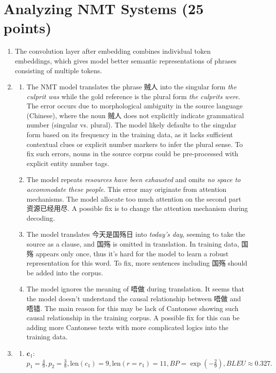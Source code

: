 \documentclass[11pt, a4paper, oneside]{article}
\begin{document}
\section{Analyzing NMT Systems (25 points)}
\begin{enumerate}[label=(\alph*), left=0pt, labelsep=1em, itemsep=1em]
    \item The convolution layer after embedding combines individual token embeddings, 
    which gives model better semantic representations of phrases consisting of multiple tokens.
    \item \begin{enumerate}[label=\roman*., left=0pt, labelsep=1em, itemsep=1em]
    \item The NMT model translates the phrase 贼人 into the singular form \textit{the 
    culprit was} while the gold reference is the plural form \textit{the culprits were}. 
    The error occurs due to morphological ambiguity in the source language (Chinese), 
    where the noun 贼人 does not explicitly indicate grammatical number (singular vs. plural). 
    The model likely defaults to the singular form based on its frequency in the training data, 
    as it lacks sufficient contextual clues or explicit number markers to infer the plural sense.
    To fix such errors, nouns in the source corpus could be pre-processed with explicit entity 
    number tags.
    \item The model repeats \textit{resources have been exhausted} and omits 
    \textit{no space to accommodate these people}. This error may originate from 
    attention mechanisms. The model allocate too much attention on the second part
    资源已经用尽. A possible fix is to change the attention mechanism during decoding.
    \item The model translates 今天是国殇日 into \textit{today's day}, seeming to take
    the source as a clause, and 国殇 is omitted in translation. In training data, 国殇
    appears only once, thus it's hard for the model to learn a robust representation for
    this word. To fix, more sentences including 国殇 should be added into the corpus.
    \item The model ignores the meaning of 唔做 during translation. It seems that the
    model doesn't understand the causal relationship between 唔做 and 唔错. The main reason for
    this may be lack of Cantonese showing such causal relationship in the training corpus. A 
    possible fix for this can be adding more Cantonese texts with more complicated logics into
    the training data.
    \end{enumerate}
    \item 
    \begin{enumerate}[label=\roman*., left=0pt, labelsep=1em, itemsep=1em]
    \item $\mathbf c_1$: $p_1 = \frac{4}{9}, p_2 = \frac{3}{8}, \mathrm{len}(c_1)=9, \mathrm{len}(r = r_1)=11, BP=\exp\left(-\frac{2}{9}\right), BLEU\approx0.327.$
    

\end{enumerate}
\end{enumerate}
\end{document}
